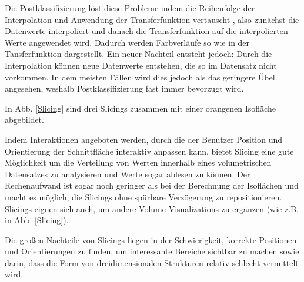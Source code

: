\documentclass[a4paper,fontsize=12pt,toc=bib,halfparskip]{scrartcl}
\begin{document}
Die Postklassifizierung l\"ost diese Probleme indem die Reihenfolge der Interpolation und Anwendung der Transferfunktion vertauscht , also zun\"achst die Datenwerte interpoliert und danach die Transferfunktion auf die interpolierten Werte angewendet wird. Dadurch werden Farbverl\"aufe so wie in der Tansferfunktion dargestellt. Ein neuer Nachteil entsteht jedoch: Durch die Interpolation k\"onnen neue Datenwerte entstehen, die so im Datensatz nicht vorkommen. In dem meisten F\"allen wird dies jedoch als das geringere \"Ubel angesehen, weshalb Postklassifizierung fast immer bevorzugt wird.

In Abb. \ref{Slicing} sind drei Slicings zusammen mit einer orangenen Isofl\"ache abgebildet.

Indem Interaktionen angeboten werden, durch die der Benutzer Position und Orientierung der Schnittfl\"ache interaktiv anpassen kann, bietet Slicing eine gute M\"oglichkeit um die Verteilung von Werten innerhalb eines volumetrischen Datensatzes zu analysieren und Werte sogar ablesen zu k\"onnen. Der Rechenaufwand ist sogar noch geringer als bei der Berechnung der Isofl\"achen und macht es m\"oglich, die Slicings ohne sp\"urbare Verz\"ogerung zu repositionieren. Slicings eignen sich auch, um andere Volume Visualizations zu erg\"anzen (wie z.B. in Abb. \ref{Slicing}).

Die gro{\ss}en Nachteile von Slicings liegen in der Schwierigkeit, korrekte Positionen und Orientierungen zu finden, um interessante Bereiche sichtbar zu machen sowie darin, dass die Form von dreidimensionalen Strukturen relativ schlecht vermittelt wird. 
\end{document}
